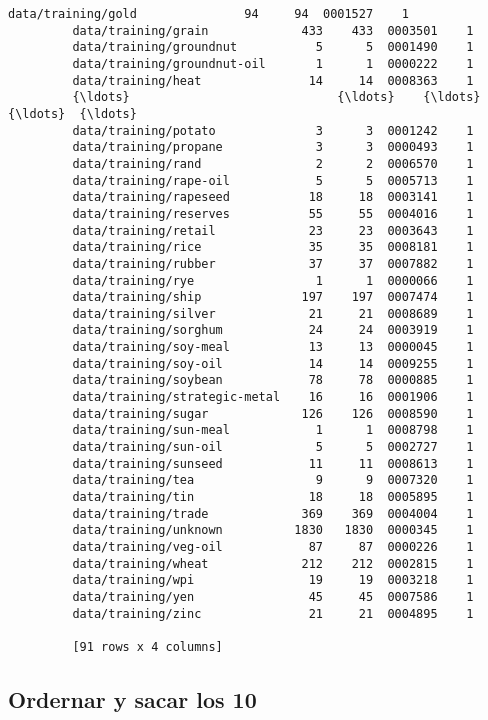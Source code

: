 \documentclass[11pt]{article}
\begin{document}
\begin{Verbatim}[commandchars=\\\{\}]
         data/training/gold               94     94  0001527    1
         data/training/grain             433    433  0003501    1
         data/training/groundnut           5      5  0001490    1
         data/training/groundnut-oil       1      1  0000222    1
         data/training/heat               14     14  0008363    1
         {\ldots}                             {\ldots}    {\ldots}      {\ldots}  {\ldots}
         data/training/potato              3      3  0001242    1
         data/training/propane             3      3  0000493    1
         data/training/rand                2      2  0006570    1
         data/training/rape-oil            5      5  0005713    1
         data/training/rapeseed           18     18  0003141    1
         data/training/reserves           55     55  0004016    1
         data/training/retail             23     23  0003643    1
         data/training/rice               35     35  0008181    1
         data/training/rubber             37     37  0007882    1
         data/training/rye                 1      1  0000066    1
         data/training/ship              197    197  0007474    1
         data/training/silver             21     21  0008689    1
         data/training/sorghum            24     24  0003919    1
         data/training/soy-meal           13     13  0000045    1
         data/training/soy-oil            14     14  0009255    1
         data/training/soybean            78     78  0000885    1
         data/training/strategic-metal    16     16  0001906    1
         data/training/sugar             126    126  0008590    1
         data/training/sun-meal            1      1  0008798    1
         data/training/sun-oil             5      5  0002727    1
         data/training/sunseed            11     11  0008613    1
         data/training/tea                 9      9  0007320    1
         data/training/tin                18     18  0005895    1
         data/training/trade             369    369  0004004    1
         data/training/unknown          1830   1830  0000345    1
         data/training/veg-oil            87     87  0000226    1
         data/training/wheat             212    212  0002815    1
         data/training/wpi                19     19  0003218    1
         data/training/yen                45     45  0007586    1
         data/training/zinc               21     21  0004895    1
         
         [91 rows x 4 columns]
\end{Verbatim}
            
    \subsection{Ordernar y sacar los 10}\label{ordernar-y-sacar-los-10}
\end{document}
